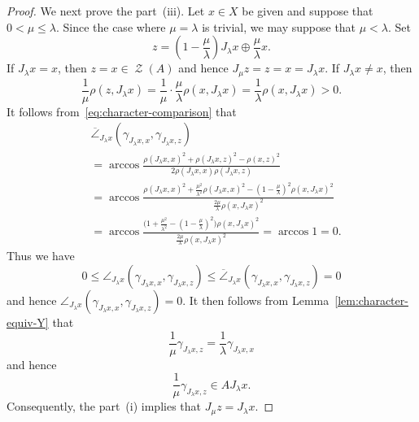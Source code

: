 \documentclass[draft]{amsart}
\numberwithin{equation}{section}
\DeclareMathOperator{\Zer}{\mathcal{Z}}
\theoremstyle{plain}
\theoremstyle{definition}
\theoremstyle{remark}
\begin{document}
\begin{proof}
 We next prove the part~(iii). 
 Let $x\in X$ be given and suppose that 
 $0<\mu\leq \lambda$. Since the case where 
 $\mu=\lambda$ is trivial, we may suppose that $\mu<\lambda$. 
 Set 
 \[
  z=\left(1-\frac{\mu}{\lambda}\right) J_{\lambda}x \oplus \frac{\mu}{\lambda}x. 
 \]
 If $J_{\lambda}x=x$, then $z=x\in \Zer (A)$ and hence $J_{\mu}z=z=x=J_{\lambda}x$. 
 If $J_{\lambda}x \neq x$, then 
 \[
  \frac{1}{\mu}\rho(z, J_{\lambda}x)
  = \frac{1}{\mu} \cdot \frac{\mu}{\lambda} \rho(x, J_{\lambda}x)
  = \frac{1}{\lambda} \rho(x, J_{\lambda}x)>0.  
 \]
 It follows from~\eqref{eq:character-comparison} that 
 \begin{align*}
 & \overline{\angle}_{J_{\lambda}x} (\gamma_{J_{\lambda}x, x}, 
 \gamma_{J_{\lambda}x, z}) \\
 &= \arccos 
 \frac{\rho(J_{\lambda}x, x)^2 + \rho(J_{\lambda}x, z)^2 - \rho(x,z)^2}
 {2\rho(J_{\lambda}x, x)\rho(J_{\lambda}x, z)} \\
 &= \arccos 
 \frac{\rho(J_{\lambda}x, x)^2 + \frac{\mu^2}{\lambda^2}\rho(J_{\lambda}x, x)^2 
- \left(1-\frac{\mu}{\lambda}\right)^2\rho(x,J_{\lambda}x)^2}
{\frac{2\mu}{\lambda}\rho(x, J_{\lambda}x)^2}\\
 &= \arccos 
 \frac{\bigl(1+\frac{\mu^2}{\lambda^2} 
 -(1-\frac{\mu}{\lambda})^2\bigr)\rho(x,J_{\lambda}x)^2}
 {\frac{2\mu}{\lambda}\rho(x, J_{\lambda}x)^2} = \arccos 1 = 0. 
 \end{align*}
 Thus we have 
 \[
 0\leq 
 \angle_{J_{\lambda}x} (\gamma_{J_{\lambda}x, x}, 
 \gamma_{J_{\lambda}x, z})
 \leq \overline{\angle}_{J_{\lambda}x} (\gamma_{J_{\lambda}x, x}, 
 \gamma_{J_{\lambda}x, z}) =0
 \]
 and hence $\angle_{J_{\lambda}x} (\gamma_{J_{\lambda}x, x}, 
 \gamma_{J_{\lambda}x, z})=0$.  
 It then follows from Lemma~\ref{lem:character-equiv-Y} that 
 \[
  \frac{1}{\mu}\gamma_{J_{\lambda}x, z} 
 = \frac{1}{\lambda}\gamma_{J_{\lambda}x, x} 
 \]
 and hence 
 \[
  \frac{1}{\mu}\gamma_{J_{\lambda}x, z} \in AJ_{\lambda}x. 
 \]
 Consequently, the part~(i) implies that $J_{\mu}z=J_{\lambda}x$. 


\end{proof}
\end{document}
